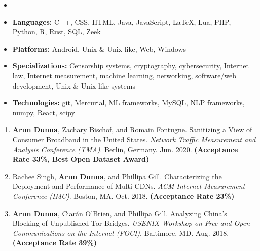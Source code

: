 \begin{itemize}
\begin{itemize}
\end{itemize}

\item[]


	\begin{itemize}

	\end{itemize}

\end{itemize}


\begin{itemize}
  \item \textbf{Languages:} C++, CSS, HTML, Java, JavaScript, LaTeX, Lua, PHP, Python, R, Rust, SQL, Zeek
  \item \textbf{Platforms:} Android, Unix \& Unix-like, Web, Windows
  \item \textbf{Specializations:} Censorship systems, cryptography, cybersecurity, Internet law, Internet measurement, machine learning, networking, software/web development, Unix \& Unix-like systems
  \item \textbf{Technologies:} git, Mercurial, ML frameworks, MySQL, NLP frameworks, numpy, React, scipy

\end{itemize}

\newpage


\begin{enumerate}
 \item \textbf{Arun Dunna}, Zachary Bischof, and Romain Fontugne. Sanitizing a View of Consumer Broadband in the United States. \textit{Network Traffic Measurement and Analysis Conference (TMA)}. Berlin, Germany. Jun. 2020. \textbf{(Acceptance Rate 33\%, Best Open Dataset Award)}
 \item Rachee Singh, \textbf{Arun Dunna}, and Phillipa Gill. Characterizing the Deployment and Performance of Multi-CDNs. \textit{ACM Internet Measurement Conference (IMC)}. Boston, MA. Oct. 2018. \textbf{(Acceptance Rate 23\%)}
 \item \textbf{Arun Dunna}, Ciar\'an O'Brien, and Phillipa Gill. Analyzing China's Blocking of Unpublished Tor Bridges. \textit{USENIX Workshop on Free and Open Communications on the Internet (FOCI)}. Baltimore, MD. Aug. 2018. \textbf{(Acceptance Rate 39\%)}
\end{enumerate}


